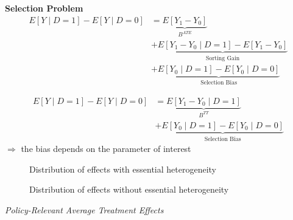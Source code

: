\begin{frame}
	\textbf{Selection Problem}
	\begin{align*}
		E[Y\mid D = 1] - E[Y\mid D = 0] & = \underbrace{E[Y_1 - Y_0]}_{B^{ATE}} \\
		& + \underbrace{E[Y_1 - Y_0 \mid D = 1] - E[Y_1 - Y_0]}_{\text{Sorting Gain}} \\
		& + \underbrace{E[Y_0\mid D = 1] - E[Y_0 \mid D = 0]}_{\text{Selection Bias}}
	\end{align*}
\end{frame}
\begin{frame}
	\begin{align*}
		E[Y\mid D = 1] - E[Y\mid D = 0] & = \underbrace{E[Y_1 - Y_0\mid D = 1]}_{B^{TT}} \\
		& + \underbrace{E[Y_0\mid D= 1]- E[Y_0 \mid D = 0]}_{\text{Selection Bias}}
	\end{align*}
	\(\Rightarrow\) the bias depends on the parameter of interest
\end{frame}
\begin{frame}
	\begin{figure}\caption{Distribution of effects with essential heterogeneity}
	\end{figure}
\end{frame}
\begin{frame}
	\begin{figure}\caption{Distribution of effects without essential heterogeneity}
	\end{figure}
\end{frame}
\begin{frame}\begin{center}
		\LARGE\textit{Policy-Relevant Average Treatment Effects}
\end{center}\end{frame}
